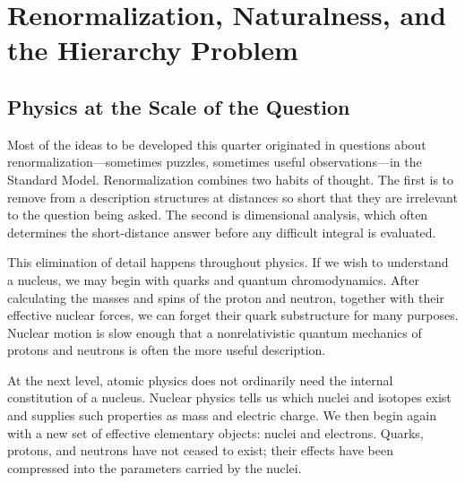 \chapter{Renormalization, Naturalness, and the Hierarchy Problem}


\section{Physics at the Scale of the Question}

Most of the ideas to be developed this quarter originated in questions about
renormalization---sometimes puzzles, sometimes useful observations---in the
Standard Model. Renormalization combines two habits
of thought. The first is to remove from a description structures at distances
so short that they are irrelevant to the question being asked. The second is
dimensional analysis, which often determines the short-distance answer before
any difficult integral is evaluated.

This elimination of detail happens throughout physics. If we wish to
understand a nucleus, we may begin with quarks and quantum chromodynamics.
After calculating the masses and spins of the proton and neutron, together
with their effective nuclear forces, we can forget their quark substructure
for many purposes. Nuclear motion is slow enough that a nonrelativistic
quantum mechanics of protons and neutrons is often the more useful
description.

At the next level, atomic physics does not ordinarily need the internal
constitution of a nucleus. Nuclear physics tells us which nuclei and isotopes
exist and supplies such properties as mass and electric charge. We then begin
again with a new set of effective elementary objects: nuclei and electrons.
Quarks, protons, and neutrons have not ceased to exist; their effects have
been compressed into the parameters carried by the nuclei.

